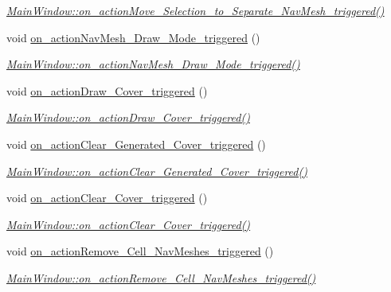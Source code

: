 \begin{DoxyCompactItemize}
\begin{DoxyCompactList}\small\item\em \hyperlink{class_main_window_a22f2240480e250819d2fbbaf2a6cf13b}{Main\+Window\+::on\+\_\+action\+Move\+\_\+\+Selection\+\_\+to\+\_\+\+Separate\+\_\+\+Nav\+Mesh\+\_\+triggered()} \end{DoxyCompactList}\item 
void \hyperlink{class_main_window_ae9c6d0a50e7481bb627e9602b306a265}{on\+\_\+action\+Nav\+Mesh\+\_\+\+Draw\+\_\+\+Mode\+\_\+triggered} ()
\begin{DoxyCompactList}\small\item\em \hyperlink{class_main_window_ae9c6d0a50e7481bb627e9602b306a265}{Main\+Window\+::on\+\_\+action\+Nav\+Mesh\+\_\+\+Draw\+\_\+\+Mode\+\_\+triggered()} \end{DoxyCompactList}\item 
void \hyperlink{class_main_window_a95505aa506e45dc84d8890778ad64212}{on\+\_\+action\+Draw\+\_\+\+Cover\+\_\+triggered} ()
\begin{DoxyCompactList}\small\item\em \hyperlink{class_main_window_a95505aa506e45dc84d8890778ad64212}{Main\+Window\+::on\+\_\+action\+Draw\+\_\+\+Cover\+\_\+triggered()} \end{DoxyCompactList}\item 
void \hyperlink{class_main_window_a1c13e2deb928b26279035e49ffb5a381}{on\+\_\+action\+Clear\+\_\+\+Generated\+\_\+\+Cover\+\_\+triggered} ()
\begin{DoxyCompactList}\small\item\em \hyperlink{class_main_window_a1c13e2deb928b26279035e49ffb5a381}{Main\+Window\+::on\+\_\+action\+Clear\+\_\+\+Generated\+\_\+\+Cover\+\_\+triggered()} \end{DoxyCompactList}\item 
void \hyperlink{class_main_window_aa76285613d70d8f605af173f444232aa}{on\+\_\+action\+Clear\+\_\+\+Cover\+\_\+triggered} ()
\begin{DoxyCompactList}\small\item\em \hyperlink{class_main_window_aa76285613d70d8f605af173f444232aa}{Main\+Window\+::on\+\_\+action\+Clear\+\_\+\+Cover\+\_\+triggered()} \end{DoxyCompactList}\item 
void \hyperlink{class_main_window_a263f139f0eb0fe0f0986c71509a371f6}{on\+\_\+action\+Remove\+\_\+\+Cell\+\_\+\+Nav\+Meshes\+\_\+triggered} ()
\begin{DoxyCompactList}\small\item\em \hyperlink{class_main_window_a263f139f0eb0fe0f0986c71509a371f6}{Main\+Window\+::on\+\_\+action\+Remove\+\_\+\+Cell\+\_\+\+Nav\+Meshes\+\_\+triggered()} \end{DoxyCompactList}\item 

\end{DoxyCompactItemize}
